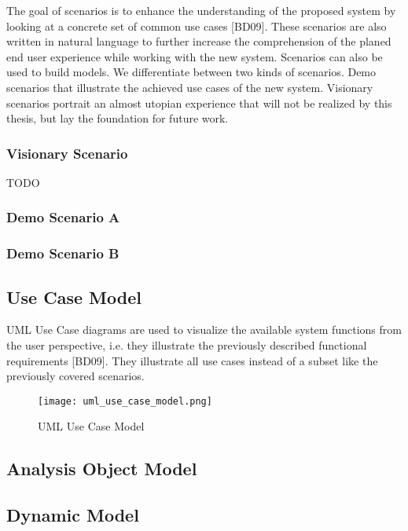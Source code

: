 The goal of scenarios is to enhance the understanding of the proposed system by looking at a concrete set of common use cases [BD09].
These scenarios are also written in natural language to further increase the comprehension of the planed end user experience while working with the new system.
Scenarios can also be used to build models. We differentiate between two kinds of scenarios.
Demo scenarios that illustrate the achieved use cases of the new system.
Visionary scenarios portrait an almost utopian experience that will not be realized by this thesis, but lay the foundation for future work.

\subsubsection{Visionary Scenario}
TODO
\subsubsection{Demo Scenario A}

\subsubsection{Demo Scenario B}

\subsection{Use Case Model}
UML Use Case diagrams are used to visualize the available system functions from the user perspective, i.e. they illustrate the previously described functional requirements [BD09].
They illustrate all use cases instead of a subset like the previously covered scenarios.

\begin{figure}[p]
    \begin{adjustwidth}{-0.1\paperwidth}{-0.1\paperwidth}
        \centering
        \texttt{[image: uml\_use\_case\_model.png]}
        \caption{UML Use Case Model}
        \label{fig:uml_use_case_model}
    \end{adjustwidth}
\end{figure}


\subsection{Analysis Object Model}
\subsection{Dynamic Model}
